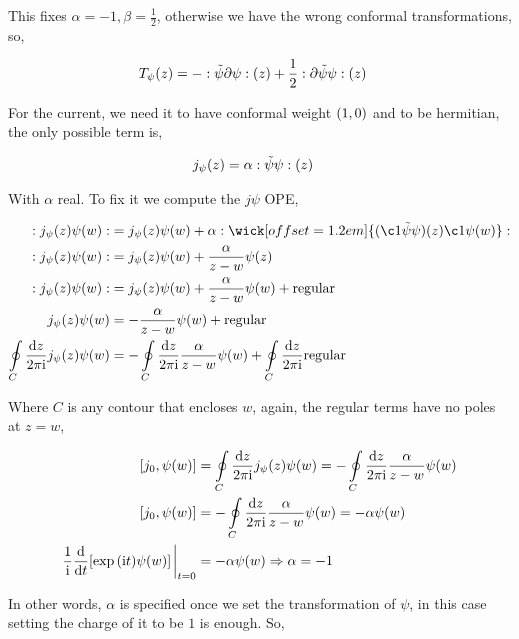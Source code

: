 This fixes $\alpha=-1,\beta=\frac12$, otherwise we have the wrong conformal transformations, so,

\begin{align*}
    T_\psi\qty(z)&=-:\tilde\psi\partial\psi:\qty(z)+\frac12:\partial\tilde\psi\psi:\qty(z)
\end{align*}

For the current, we need it to have conformal weight $\qty(1,0)$ and to be hermitian, the only possible term is,

\begin{align*}
    j_\psi\qty(z)&=\alpha:\tilde\psi\psi:\qty(z)
\end{align*}
 
With $\alpha$ real. To fix it we compute the $j\psi$ OPE,

\begin{align*}
    \cnord{j_\psi\qty(z)\psi\qty(w)}&=j_\psi\qty(z)\psi\qty(w)+\alpha\cnord{\wick[offset=1.2em]{(\c1{\tilde\psi}\psi)\qty(z)\c1\psi\qty(w)}}\\
    \cnord{j_\psi\qty(z)\psi\qty(w)}&=j_\psi\qty(z)\psi\qty(w)+\frac{\alpha}{z-w}\psi\qty(z)\\
    \cnord{j_\psi\qty(z)\psi\qty(w)}&=j_\psi\qty(z)\psi\qty(w)+\frac{\alpha}{z-w}\psi\qty(w)+\textnormal{regular}\\
    j_\psi\qty(z)\psi\qty(w)&=-\frac{\alpha}{z-w}\psi\qty(w)+\textnormal{regular}\\
    \oint\limits_C\frac{\dd{z}}{2\pi\im}j_\psi\qty(z)\psi\qty(w)&=-\oint\limits_C\frac{\dd{z}}{2\pi\im}\frac{\alpha}{z-w}\psi\qty(w)+\oint\limits_C\frac{\dd{z}}{2\pi\im}\textnormal{regular}
\end{align*}

Where $C$ is any contour that encloses $w$, again, the regular terms have no poles at $z=w$,

\begin{align*}
    \comm{j_0}{\psi\qty(w)}&=\oint\limits_C\frac{\dd{z}}{2\pi\im}j_\psi\qty(z)\psi\qty(w)=-\oint\limits_C\frac{\dd{z}}{2\pi\im}\frac{\alpha}{z-w}\psi\qty(w)\\
    \comm{j_0}{\psi\qty(w)}&=-\oint\limits_C\frac{\dd{z}}{2\pi\im}\frac{\alpha}{z-w}\psi\qty(w)=-\alpha\psi\qty(w)\\
    \frac{1}{\im}\dv{}{t}\qty[\exp\qty(\im t)\psi\qty(w)]\eval_{t=0}&=-\alpha\psi\qty(w)\Rightarrow \alpha=-1
\end{align*}

In other words, $\alpha$ is specified once we set the transformation of $\psi$, in this case setting the charge of it to be $1$ is enough. So,

